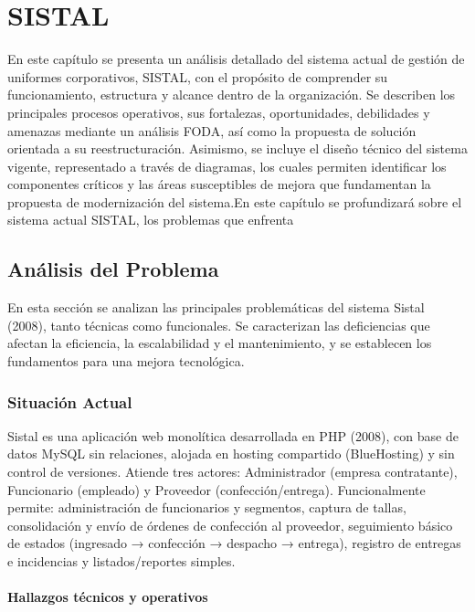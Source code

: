 \chapter{SISTAL}

En este capítulo se presenta un análisis detallado del sistema actual de gestión de uniformes corporativos, SISTAL, con el propósito de comprender su funcionamiento, estructura y alcance dentro de la organización. Se describen los principales procesos operativos, sus fortalezas, oportunidades, debilidades y amenazas mediante un análisis FODA, así como la propuesta de solución orientada a su reestructuración.
Asimismo, se incluye el diseño técnico del sistema vigente, representado a través de diagramas, los cuales permiten identificar los componentes críticos y las áreas susceptibles de mejora que fundamentan la propuesta de modernización del sistema.En este capítulo se profundizará sobre el sistema actual SISTAL, los problemas que enfrenta

\section{Análisis del Problema}

En esta sección se analizan las principales problemáticas del sistema Sistal (2008), tanto técnicas como funcionales. Se caracterizan las deficiencias que afectan la eficiencia, la escalabilidad y el mantenimiento, y se establecen los fundamentos para una mejora tecnológica.


\subsection{Situación Actual}

Sistal es una aplicación web monolítica desarrollada en PHP (2008), con base de datos MySQL sin relaciones, alojada en hosting compartido (BlueHosting) y sin control de versiones. Atiende tres actores: Administrador (empresa contratante), Funcionario (empleado) y Proveedor (confección/entrega).
Funcionalmente permite: administración de funcionarios y segmentos, captura de tallas, consolidación y envío de órdenes de confección al proveedor, seguimiento básico de estados (ingresado → confección → despacho → entrega), registro de entregas e incidencias y listados/reportes simples.

\subsubsection{Hallazgos técnicos y operativos}


